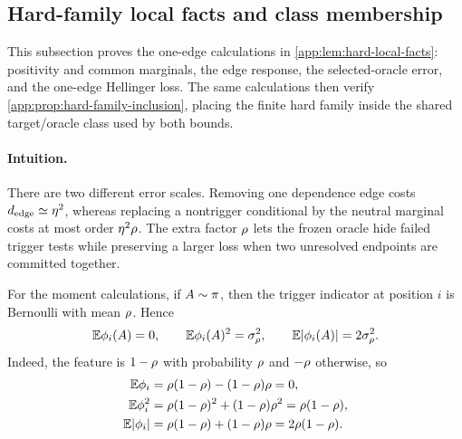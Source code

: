 \subsection{Hard-family local facts and class membership}
\label{app:lower-proof-family}

This subsection proves the one-edge calculations in
\cref{app:lem:hard-local-facts}: positivity and common marginals, the edge
response, the selected-oracle error, and the one-edge Hellinger loss.  The
same calculations then verify \cref{app:prop:hard-family-inclusion}, placing
the finite hard family inside the shared target/oracle class used by both
bounds.

\paragraph{Intuition.}
There are two different error scales.  Removing one dependence edge costs
$d_{\mathrm{edge}}\simeq\eta^2$, whereas replacing a nontrigger
conditional by the neutral marginal costs at most order
$\eta^2\rho$.  The extra factor $\rho$ lets the
frozen oracle hide failed trigger tests while preserving a larger loss
when two unresolved endpoints are committed together.

For the moment calculations, if
\(A\sim\pi\), then the trigger indicator at position \(i\) is
Bernoulli with mean \(\rho\).  Hence
\begin{equation}
 \mathbb E\phi_{i}(A)=0,
 \qquad
 \mathbb E\phi_{i}(A)^2=\sigma_\rho^2,
 \qquad
 \mathbb E|\phi_{i}(A)|=2\sigma_\rho^2.
 \label{app:eq:hard-feature-moments}
\end{equation}
Indeed, the feature is $1-\rho$ with probability $\rho$
and $-\rho$ otherwise, so
\[
\begin{aligned}
 \mathbb E\phi_{i}
 &=\rho(1-\rho)
   -(1-\rho)\rho=0,\\
 \mathbb E\phi_{i}^2
 &=\rho(1-\rho)^2
   +(1-\rho)\rho^2
   =\rho(1-\rho),\\
 \mathbb E|\phi_{i}|
 &=\rho(1-\rho)
   +(1-\rho)\rho
   =2\rho(1-\rho).
\end{aligned}
\]

